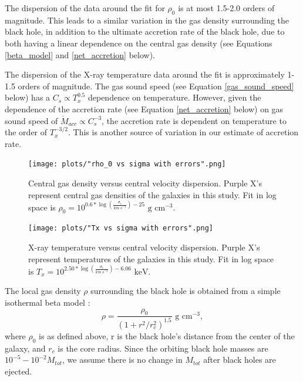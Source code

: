 \documentclass[fleqn,usenatbib,useAMS]{mnras}
\begin{document}
The dispersion of the data around the fit for $\rho_0$ is at most 1.5-2.0 orders of magnitude.  This leads to a similar variation in the gas density surrounding the black hole, in addition to the ultimate accretion rate of the black hole, due to both having a linear dependence on the central gas density (see Equations \eqref{beta_model} and \eqref{net_accretion} below).

The dispersion of the X-ray temperature data around the fit is approximately 1-1.5 orders of magnitude.  The gas sound speed (see Equation \eqref{gas_sound_speed} below) has a $C_s{\propto}T_x^{0.5}$ dependence on temperature.  However, given the dependence of the accretion rate (see Equation \eqref{net_accretion} below) on gas sound speed of $\dot{M}_{acc}{\propto}C_s^{-3}$, the accretion rate is dependent on temperature to the order of $T_x^{-3/2}$.  This is another source of variation in our estimate of accretion rate.

\begin{figure}
\vspace{20pt}%
\begin{center}
\texttt{[image: plots/"rho\_0 vs sigma with errors".png]}
\caption{Central gas density versus central velocity dispersion.  Purple X's represent central gas densities of the galaxies in this study.  Fit in log space is $\rho_0 = 10^{0.6*\log\left(\frac{\sigma_c}{km\ s^{-1}}\right) - 25} \text{  g cm}^{-3}$.}
\label{fig:rho0_vs_sigma}
\end{center}
\end{figure}

\begin{figure}
\vspace{20pt}%
\begin{center}
\texttt{[image: plots/"Tx vs sigma with errors".png]}
\caption{X-ray temperature versus central velocity dispersion.  Purple X's represent temperatures of the galaxies in this study.  Fit in log space is $T_x = 10^{2.50*\log\left(\frac{\sigma_c}{km\ s^{-1}}\right) - 6.06} \text{  keV}$.}
\label{fig:Tx_vs_sigma}
\end{center}
\end{figure}

The local gas density ${\rho}$ surrounding the black hole is obtained from a simple isothermal beta model \citep{1962AJ.....67..471K, 1976A&A....49..137C, 1978A&A....70..677C}:
\begin{equation} \label{beta_model}
    \rho = \frac{\rho_0}{(1+r^2/r_c^2)^{1.5}} \text{  g cm}^{-3},
\end{equation}
where $\rho_0$ is as defined above, r is the black hole's distance from the center of the galaxy, and $r_c$ is the core radius.  Since the orbiting black hole masses are $10^{-5}-10^{-2}M_{tot}$, we assume there is no change in $M_{tot}$ after black holes are ejected.
\end{document}

